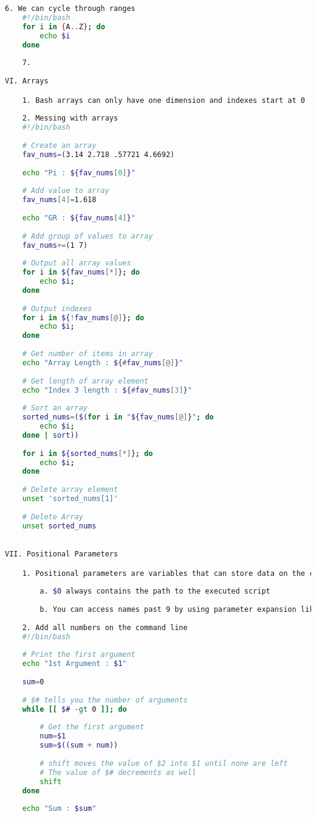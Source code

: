 \begin{lstlisting}[language=bash,caption={basics of bash}]
  	6. We can cycle through ranges
  	#!/bin/bash
  	for i in {A..Z}; do
  		echo $i
  	done
  	
  	7.
  	
VI. Arrays

	1. Bash arrays can only have one dimension and indexes start at 0
	
	2. Messing with arrays
	#!/bin/bash
	
	# Create an array
	fav_nums=(3.14 2.718 .57721 4.6692)
	
	echo "Pi : ${fav_nums[0]}"
	
	# Add value to array
	fav_nums[4]=1.618
	
	echo "GR : ${fav_nums[4]}"
	
	# Add group of values to array
	fav_nums+=(1 7)
	
	# Output all array values
	for i in ${fav_nums[*]}; do
		echo $i;
	done
	
	# Output indexes
	for i in ${!fav_nums[@]}; do
		echo $i;
	done
	
	# Get number of items in array
	echo "Array Length : ${#fav_nums[@]}"
	
	# Get length of array element
	echo "Index 3 length : ${#fav_nums[3]}"
	
	# Sort an array
	sorted_nums=($(for i in "${fav_nums[@]}"; do
		echo $i;
	done | sort))
	
	for i in ${sorted_nums[*]}; do
		echo $i;
	done
	
	# Delete array element
	unset 'sorted_nums[1]'
	
	# Delete Array
	unset sorted_nums

	
VII. Positional Parameters

	1. Positional parameters are variables that can store data on the command line in variable names 0 - 9
	
		a. $0 always contains the path to the executed script
		
		b. You can access names past 9 by using parameter expansion like this ${10}
		
	2. Add all numbers on the command line
	#!/bin/bash
	
	# Print the first argument
	echo "1st Argument : $1"
	
	sum=0
	
	# $# tells you the number of arguments
	while [[ $# -gt 0 ]]; do
	
		# Get the first argument
		num=$1
		sum=$((sum + num))
		
		# shift moves the value of $2 into $1 until none are left
		# The value of $# decrements as well
		shift
	done
	
	echo "Sum : $sum"
\end{lstlisting}